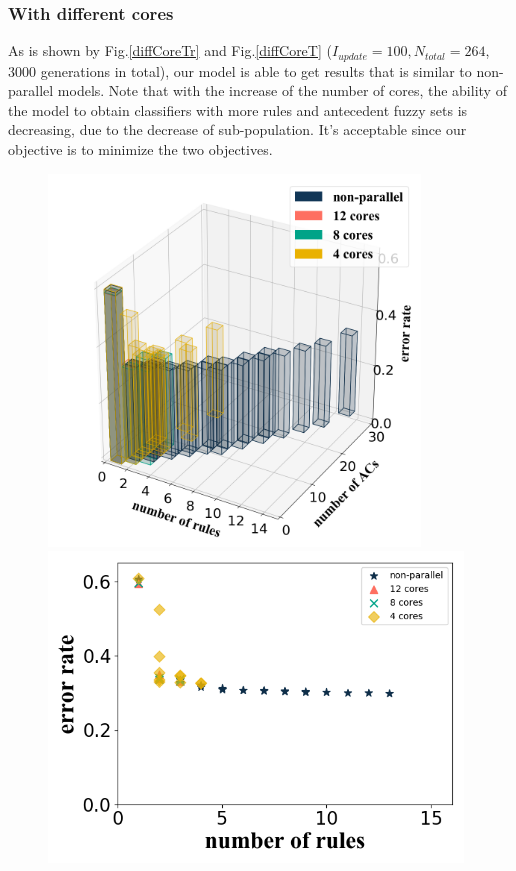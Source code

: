 \documentclass[conference]{IEEEtran}
\begin{document}
  \subsubsection{With different cores}
As is shown by Fig.\ref{diffCoreTr} and Fig.\ref{diffCoreT} ($I_{update} = 100, N_{total} = 264$, 3000 generations in total), our model is able to get results that is similar to non-parallel models. Note that with the increase of the number of cores, the ability of the model to obtain classifiers with more rules and antecedent fuzzy sets is decreasing, due to the decrease of sub-population. It's acceptable since our objective is to minimize the two objectives.
  \begin{figure}[H]
    \centering
    \begin{minipage}[t]{0.40\textwidth}
    \includegraphics[width=0.88\textwidth]{figures/diffCoreTrain1.png}
    \end{minipage}
    \centering
    \begin{minipage}[t]{0.25\textwidth}
    \includegraphics[width=0.98\textwidth]{figures/diffCoreTrain2.png}

\end{minipage}
\end{figure}
\end{document}
